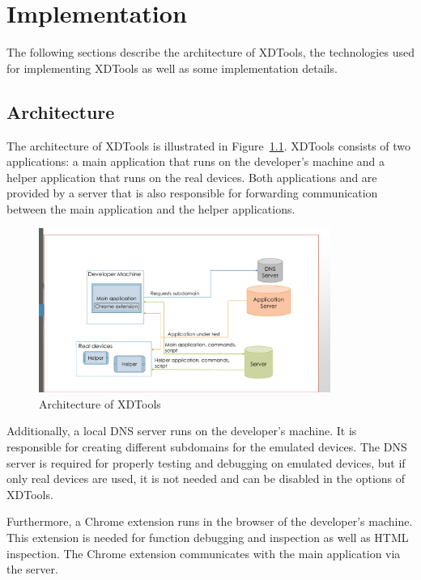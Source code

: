 \chapter{Implementation}

The following sections describe the architecture of XDTools, the technologies used for implementing XDTools as well as some implementation details.

\section{Architecture}

The architecture of XDTools is illustrated in Figure~\ref{fig:architecture}. XDTools consists of two applications: a main application that runs on the developer's machine and a helper application that runs on the real devices. Both applications and are provided by a server that is also responsible for forwarding communication between the main application and the helper applications.

\begin{figure}[H]
  \centering
    \includegraphics[width=0.85\textwidth]{images/architecture_2.pdf}
	\caption[Architecture of XDTools]{Architecture of XDTools}
	\label{fig:architecture}
\end{figure}

Additionally, a local DNS server runs on the developer's machine. It is responsible for creating different subdomains for the emulated devices. The DNS server is required for properly testing and debugging on emulated devices, but if only real devices are used, it is not needed and can be disabled in the options of XDTools.

Furthermore, a Chrome extension runs in the browser of the developer's machine. This extension is needed for function debugging and inspection as well as HTML inspection. The Chrome extension communicates with the main application via the server.

